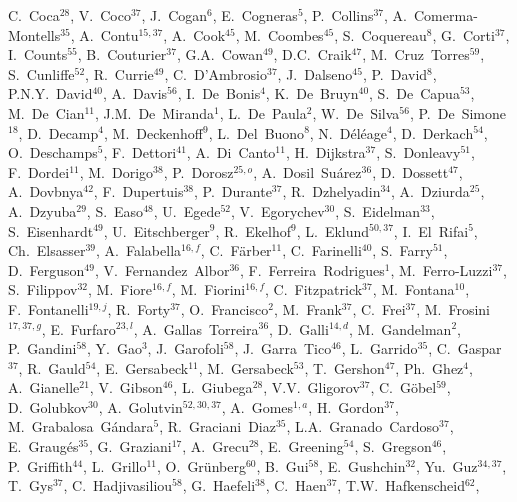 \documentclass[12pt,a4paper]{article}
\begin{document}
\begin{flushleft}
C.~Coca$^{28}$, 
V.~Coco$^{37}$, 
J.~Cogan$^{6}$, 
E.~Cogneras$^{5}$, 
P.~Collins$^{37}$, 
A.~Comerma-Montells$^{35}$, 
A.~Contu$^{15,37}$, 
A.~Cook$^{45}$, 
M.~Coombes$^{45}$, 
S.~Coquereau$^{8}$, 
G.~Corti$^{37}$, 
I.~Counts$^{55}$, 
B.~Couturier$^{37}$, 
G.A.~Cowan$^{49}$, 
D.C.~Craik$^{47}$, 
M.~Cruz~Torres$^{59}$, 
S.~Cunliffe$^{52}$, 
R.~Currie$^{49}$, 
C.~D'Ambrosio$^{37}$, 
J.~Dalseno$^{45}$, 
P.~David$^{8}$, 
P.N.Y.~David$^{40}$, 
A.~Davis$^{56}$, 
I.~De~Bonis$^{4}$, 
K.~De~Bruyn$^{40}$, 
S.~De~Capua$^{53}$, 
M.~De~Cian$^{11}$, 
J.M.~De~Miranda$^{1}$, 
L.~De~Paula$^{2}$, 
W.~De~Silva$^{56}$, 
P.~De~Simone$^{18}$, 
D.~Decamp$^{4}$, 
M.~Deckenhoff$^{9}$, 
L.~Del~Buono$^{8}$, 
N.~D\'{e}l\'{e}age$^{4}$, 
D.~Derkach$^{54}$, 
O.~Deschamps$^{5}$, 
F.~Dettori$^{41}$, 
A.~Di~Canto$^{11}$, 
H.~Dijkstra$^{37}$, 
S.~Donleavy$^{51}$, 
F.~Dordei$^{11}$, 
M.~Dorigo$^{38}$, 
P.~Dorosz$^{25,o}$, 
A.~Dosil~Su\'{a}rez$^{36}$, 
D.~Dossett$^{47}$, 
A.~Dovbnya$^{42}$, 
F.~Dupertuis$^{38}$, 
P.~Durante$^{37}$, 
R.~Dzhelyadin$^{34}$, 
A.~Dziurda$^{25}$, 
A.~Dzyuba$^{29}$, 
S.~Easo$^{48}$, 
U.~Egede$^{52}$, 
V.~Egorychev$^{30}$, 
S.~Eidelman$^{33}$, 
S.~Eisenhardt$^{49}$, 
U.~Eitschberger$^{9}$, 
R.~Ekelhof$^{9}$, 
L.~Eklund$^{50,37}$, 
I.~El~Rifai$^{5}$, 
Ch.~Elsasser$^{39}$, 
A.~Falabella$^{16,f}$, 
C.~F\"{a}rber$^{11}$, 
C.~Farinelli$^{40}$, 
S.~Farry$^{51}$, 
D.~Ferguson$^{49}$, 
V.~Fernandez~Albor$^{36}$, 
F.~Ferreira~Rodrigues$^{1}$, 
M.~Ferro-Luzzi$^{37}$, 
S.~Filippov$^{32}$, 
M.~Fiore$^{16,f}$, 
M.~Fiorini$^{16,f}$, 
C.~Fitzpatrick$^{37}$, 
M.~Fontana$^{10}$, 
F.~Fontanelli$^{19,j}$, 
R.~Forty$^{37}$, 
O.~Francisco$^{2}$, 
M.~Frank$^{37}$, 
C.~Frei$^{37}$, 
M.~Frosini$^{17,37,g}$, 
E.~Furfaro$^{23,l}$, 
A.~Gallas~Torreira$^{36}$, 
D.~Galli$^{14,d}$, 
M.~Gandelman$^{2}$, 
P.~Gandini$^{58}$, 
Y.~Gao$^{3}$, 
J.~Garofoli$^{58}$, 
J.~Garra~Tico$^{46}$, 
L.~Garrido$^{35}$, 
C.~Gaspar$^{37}$, 
R.~Gauld$^{54}$, 
E.~Gersabeck$^{11}$, 
M.~Gersabeck$^{53}$, 
T.~Gershon$^{47}$, 
Ph.~Ghez$^{4}$, 
A.~Gianelle$^{21}$, 
V.~Gibson$^{46}$, 
L.~Giubega$^{28}$, 
V.V.~Gligorov$^{37}$, 
C.~G\"{o}bel$^{59}$, 
D.~Golubkov$^{30}$, 
A.~Golutvin$^{52,30,37}$, 
A.~Gomes$^{1,a}$, 
H.~Gordon$^{37}$, 
M.~Grabalosa~G\'{a}ndara$^{5}$, 
R.~Graciani~Diaz$^{35}$, 
L.A.~Granado~Cardoso$^{37}$, 
E.~Graug\'{e}s$^{35}$, 
G.~Graziani$^{17}$, 
A.~Grecu$^{28}$, 
E.~Greening$^{54}$, 
S.~Gregson$^{46}$, 
P.~Griffith$^{44}$, 
L.~Grillo$^{11}$, 
O.~Gr\"{u}nberg$^{60}$, 
B.~Gui$^{58}$, 
E.~Gushchin$^{32}$, 
Yu.~Guz$^{34,37}$, 
T.~Gys$^{37}$, 
C.~Hadjivasiliou$^{58}$, 
G.~Haefeli$^{38}$, 
C.~Haen$^{37}$, 
T.W.~Hafkenscheid$^{62}$, 

\end{flushleft}
\end{document}
